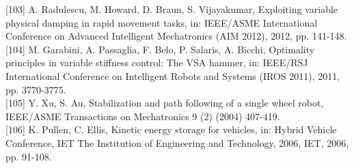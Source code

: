 \documentclass[10pt]{article}
\begin{document}
[103] A. Radulescu, M. Howard, D. Braun, S. Vijayakumar, Exploiting variable physical damping in rapid movement tasks, in: IEEE/ASME International Conference on Advanced Intelligent Mechatronics (AIM 2012), 2012, pp. 141-148.\\[0pt]
[104] M. Garabini, A. Passaglia, F. Belo, P. Salaris, A. Bicchi, Optimality principles in variable stiffness control: The VSA hammer, in: IEEE/RSJ International Conference on Intelligent Robots and Systems (IROS 2011), 2011, pp. 3770-3775.\\[0pt]
[105] Y. Xu, S. Au, Stabilization and path following of a single wheel robot, IEEE/ASME Transactions on Mechatronics 9 (2) (2004) 407-419.\\[0pt]
[106] K. Pullen, C. Ellis, Kinetic energy storage for vehicles, in: Hybrid Vehicle Conference, IET The Institution of Engineering and Technology, 2006, IET, 2006, pp. 91-108.
\end{document}
